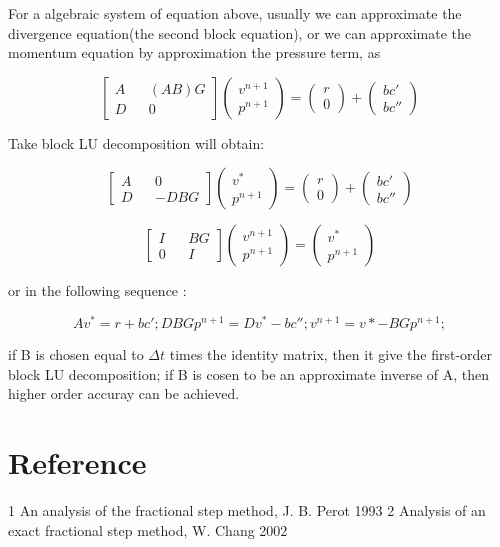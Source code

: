 \documentclass[11pt]{article}
\begin{document}
For a algebraic system of equation above, usually we can approximate the divergence equation(the second block equation), or we can approximate the momentum equation by approximation the pressure term, as 

 $$ 
\begin{bmatrix} A &&  (AB)G \\ D &&  0 \end{bmatrix} \begin{pmatrix} v^{n+1} \\ p^{n+1} \end{pmatrix} = \left( \begin{array}{c} r \\ 0 \end{array} \right) + \left ( \begin{array}{c} bc' \\ bc'' \end{array} \right) $$

	
Take block LU decomposition will obtain:

$$ 
\begin{bmatrix} A && 0 \\ D && -DBG \end{bmatrix} \begin{pmatrix} v^* \\ p^{n+1} \end{pmatrix} = \left( \begin{array}{c} r \\ 0 \end{array} \right) + \left ( \begin{array}{c} bc' \\ bc'' \end{array} \right) $$

$$ 
\begin{bmatrix} I &&  BG \\ 0 && I \end{bmatrix} \begin{pmatrix} v^{n+1} \\ p^{n+1} \end{pmatrix} = \left( \begin{array}{c} v^* \\ p^{n+1} \end{array} \right) $$

or in the following sequence :

\begin{equation}
	A v^* = r + bc';
	DBG p^{n+1} = D v^* - bc'' ;
  	v^{n+1} = v* - BG p^{n+1};
\end{equation}

if B is chosen equal to $\Delta t$ times the identity matrix, then it give the first-order block LU decomposition;
if B is cosen to be an approximate inverse of A, then higher order accuray can be achieved.


\section {Reference}
1 An analysis of the fractional step method, J. B. Perot 1993
2 Analysis of an exact fractional step method, W. Chang 2002
\end{document}
